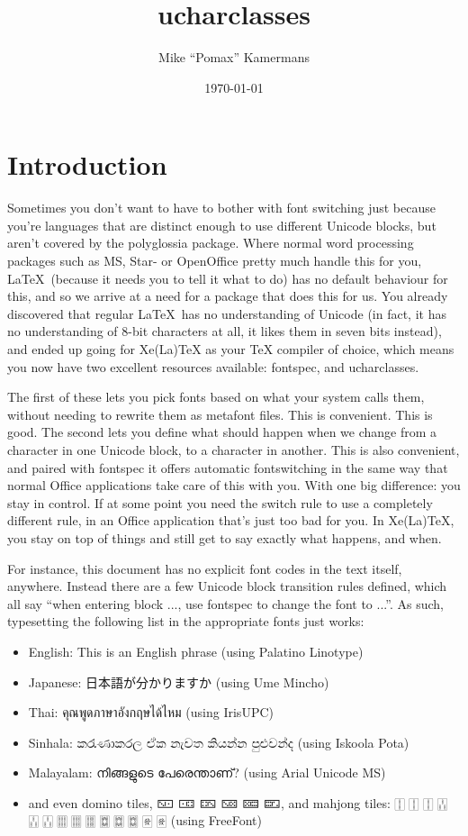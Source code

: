 ﻿\documentclass{article}
\newenvironment{itemlist}{%
  \begin{itemize}
	\setlength{\itemsep}{0pt}
	\setlength{\parsep}{0pt}
	\setlength{\topsep}{0pt}
	\setlength{\partopsep}{0pt}
	\setlength{\parskip}{0pt}
	\setlength{\labelsep}{5pt}}%
{
  \end{itemize}}
\begin{document}
	\title{ucharclasses}
	\author{Mike “Pomax” Kamermans}
	\date{\today}
	\maketitle

	\tableofcontents

	\pagebreak

	\section{Introduction}
	
		Sometimes you don't want to have to bother with font switching just because you're languages that are distinct enough to use different Unicode blocks, but aren't covered by the polyglossia package. Where normal word processing packages such as MS, Star- or OpenOffice pretty much handle this for you, \LaTeX\ (because it needs you to tell it what to do) has no default behaviour for this, and so we arrive at a need for a package that does this for us. You already discovered that regular \LaTeX\ has no understanding of Unicode (in fact, it has no understanding of 8-bit characters at all, it likes them in seven bits instead), and ended up going for Xe(La)TeX as your TeX compiler of choice, which means you now have two excellent resources available: fontspec, and ucharclasses.
		
		The first of these lets you pick fonts based on what your system calls them, without needing to rewrite them as metafont files. This is convenient. This is good. The second lets you define what should happen when we change from a character in one Unicode block, to a character in another. This is also convenient, and paired with fontspec it offers automatic fontswitching in the same way that normal Office applications take care of this with you. With one big difference: you stay in control. If at some point you need the switch rule to use a completely different rule, in an Office application that's just too bad for you. In Xe(La)TeX, you stay on top of things and still get to say exactly what happens, and when.
		
		For instance, this document has no explicit font codes in the text itself, anywhere. Instead there are a few Unicode block transition rules defined, which all say “when entering block ..., use fontspec to change the font to ...”. As such, typesetting the following list in the appropriate fonts just works:
		
		\begin{itemlist}
			\item English: This is an English phrase (using Palatino Linotype)
			\item Japanese: 日本語が分かりますか (using Ume Mincho)
			\item Thai: คุณพูดภาษาอังกฤษได้ไหม (using IrisUPC)
			\item Sinhala: කරැණාකරල ඒක නැවත කියන්න පුළුවන්ද (using Iskoola Pota)
			\item Malayalam: നിങ്ങളുടെ പേരെന്താണ്? (using Arial Unicode MS)
			\item and even domino tiles, 🁇 🀼 🁐 🁋 🁚 🁝, and mahjong tiles: 🀑 🀑 🀑 🀒 🀒 🀒 🀕 🀕 🀕 🀗 🀗 🀗 🀅 🀅 (using FreeFont)
		\end{itemlist}
\end{document}

